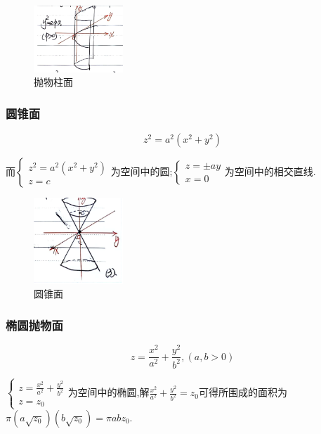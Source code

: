 \begin{figure}[htbp]
    \centering
    \includegraphics[width=0.3\textwidth]{figure/4-3.png}
    \caption{抛物柱面}
    \label{fig:抛物柱面}
\end{figure}

\subsubsection*{圆锥面}

$$
z^2 = a^2(x^2 + y^2)
$$

而$\begin{cases}
    z^2 = a^2(x^2 + y^2)\\
    z = c
\end{cases}$为空间中的圆;$\begin{cases}
    z = \pm ay\\
    x = 0
\end{cases}$为空间中的相交直线.

\begin{figure}[htbp]
    \centering
    \includegraphics[width=0.3\textwidth]{figure/4-4.png}
    \caption{圆锥面}
    \label{fig:圆锥面}
\end{figure}

\subsubsection*{椭圆抛物面}

$$
z = \frac{x^2}{a^2} + \frac{y^2}{b^2},(a,b > 0)
$$

$\begin{cases}
    z = \frac{x^2}{a^2} + \frac{y^2}{b^2}\\
    z = z_0
\end{cases}$为空间中的椭圆,解$\frac{x^2}{a^2} + \frac{y^2}{b^2} = z_0$可得所围成的面积为$\pi(a\sqrt{z_0})(b\sqrt{z_0}) = \pi abz_0$.


